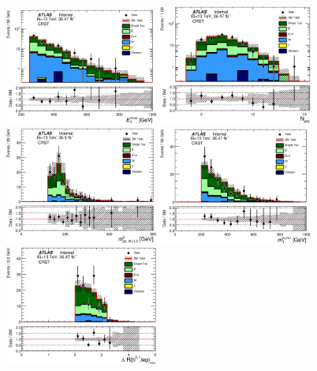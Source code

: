 \begin{figure}[htbp]
\begin{center}
\includegraphics[width=0.45\textwidth]{figures/singleTop/postfit/Met_CRST_log.eps}
\includegraphics[width=0.45\textwidth]{figures/singleTop/postfit/NJets_CRST_log.eps}
\includegraphics[width=0.45\textwidth]{figures/singleTop/postfit/AntiKt12M_0__CRST.eps}
\includegraphics[width=0.45\textwidth]{figures/singleTop/postfit/MtBMin_CRST.eps}
\includegraphics[width=0.45\textwidth]{figures/singleTop/postfit/MinDRBLep_CRST.eps}

\end{center}
\end{figure}
